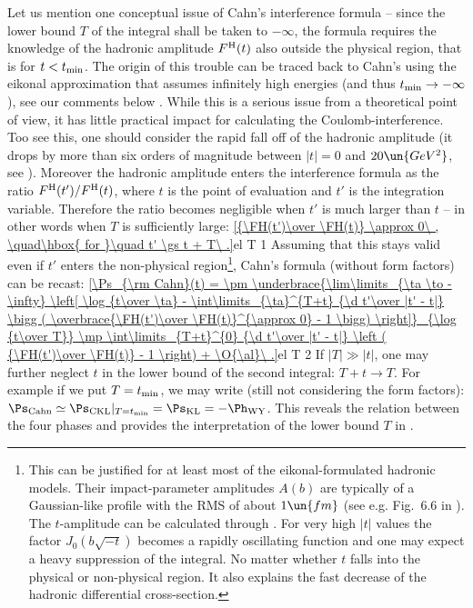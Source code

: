 Let us mention one conceptual issue of Cahn's interference formula  -- since the lower bound $T$ of the integral shall be taken to $-\infty$, the formula requires the knowledge of the hadronic amplitude $F^{\rm H}(t)$ also outside the physical region, that is for $t < t_{\rm min}$. The origin of this trouble can be traced back to Cahn's using the eikonal approximation that assumes infinitely high energies (and thus $t_{\rm min} \to -\infty$), see our comments below . While this is a serious issue from a theoretical point of view,  it has little practical impact for calculating the Coulomb-interference. Too see this, one should consider the rapid fall off of the hadronic amplitude (it drops by more than six orders of magnitude between $|t|=0$ and $20\un{GeV^2}$, see ). Moreover the hadronic amplitude enters the interference formula  as the ratio $F^{\rm H}(t') / F^{\rm H}(t)$, where $t$ is the point of evaluation and $t'$ is the integration variable. Therefore the ratio becomes negligible when $t'$ is much larger than $t$ -- in other words when $T$ is sufficiently large:
\eqref{{\FH(t')\over \FH(t)} \approx 0\ , \quad\hbox{ for }\quad t' \gs t + T\ .}{el T 1}
Assuming that this stays valid even if $t'$ enters the non-physical region\footnote{%
This can be justified for at least most of the eikonal-formulated hadronic models. Their impact-parameter amplitudes $A(b)$ are typically of a Gaussian-like profile with the RMS of about $1\un{fm}$ (see e.g. Fig.~6.6 in ). The $t$-amplitude can be calculated through . For very high $|t|$ values the factor $J_0(b\sqrt{-t})$ becomes a rapidly oscillating function and one may expect a heavy suppression of the integral. No matter whether $t$ falls into the physical or non-physical region. It also explains the fast decrease of the hadronic differential cross-section. 
}, Cahn's formula  (without form factors) can be recast:
\eqref{\Ps_{\rm Cahn}(t) =
\pm \underbrace{\lim\limits_{\ta \to -\infty} \left[
	\log {t\over \ta}
	- \int\limits_{\ta}^{T+t} {\d t'\over |t' - t|} \bigg ( \overbrace{\FH(t')\over \FH(t)}^{\approx 0} - 1 \bigg)
\right]}_{\log {t\over T}}
\mp \int\limits_{T+t}^{0} {\d t'\over |t' - t|} \left ( {\FH(t')\over \FH(t)} - 1 \right)
+ \O{\al}\ .}{el T 2}
If $|T| \gg |t|$, one may further neglect $t$ in the lower bound of the second integral: $T+t\rightarrow T$. For example if we put $T=t_{\rm min}$, we may write (still not considering the form factors): $\Ps_{\rm Cahn} \simeq \Ps_{\rm CKL}|_{T=t_{\rm min}} = \Ps_{\rm KL} = - \Ph_{\rm WY}$. This reveals the relation between the four phases and provides the interpretation of the lower bound $T$ in .

